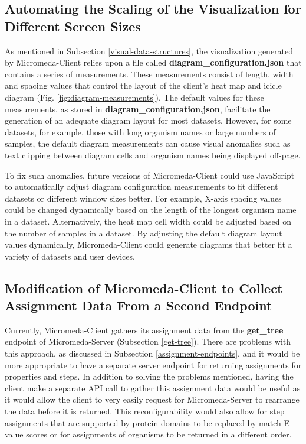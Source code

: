 \subsection{Automating the Scaling of the Visualization for Different Screen Sizes}

As mentioned in Subsection \ref{visual-data-structures}, the visualization generated by Micromeda-Client relies upon a file called \textbf{diagram\_configuration.json} that contains a series of measurements. These measurements consist of length, width and spacing values that control the layout of the client's heat map and icicle diagram (Fig. \ref{fig:diagram-measurements}). The default values for these measurements, as stored in \textbf{diagram\_configuration.json}, facilitate the generation of an adequate diagram layout for most datasets. However, for some datasets, for example, those with long organism names or large numbers of samples, the default diagram measurements can cause visual anomalies such as text clipping between diagram cells and organism names being displayed off-page.

To fix such anomalies, future versions of Micromeda-Client could use JavaScript to automatically adjust diagram configuration measurements to fit different datasets or different window sizes better. For example, X-axis spacing values could be changed dynamically based on the length of the longest organism name in a dataset. Alternatively, the heat map cell width could be adjusted based on the number of samples in a dataset. By adjusting the default diagram layout values dynamically, Micromeda-Client could generate diagrams that better fit a variety of datasets and user devices.

\subsection{Modification of Micromeda-Client to Collect Assignment Data From a Second Endpoint}

Currently, Micromeda-Client gathers its assignment data from the \textbf{get\_tree} endpoint of Micromeda-Server (Subsection \ref{get-tree}). There are problems with this approach, as discussed in Subsection \ref{assignment-endpoints}, and it would be more appropriate to have a separate server endpoint for returning assignments for properties and steps. In addition to solving the problems mentioned, having the client make a separate API call to gather this assignment data would be useful as it would allow the client to very easily request for Micromeda-Server to rearrange the data before it is returned. This reconfigurability would also allow for step assignments that are supported by protein domains to be replaced by match E-value scores or for assignments of organisms to be returned in a different order. 


